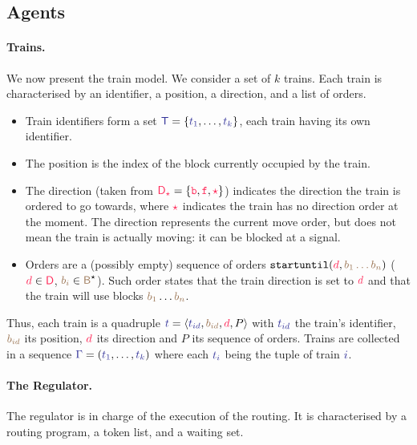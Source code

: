\documentclass[runningheads]{llncs}
\newcommand{\directions}{\dirFmt{\mathsf{D}}}
\newcommand{\forward}{\ensuremath{\mathtt{f}}}
\newcommand{\backward}{\ensuremath{\mathtt{b}}\xspace}
\newcommand{\dirFmt}[1]{{\color{dircolor} #1}}
\newcommand{\dirForward}{\ensuremath{\dirFmt{\forward}}\xspace}
\newcommand{\dirBackward}{\ensuremath{\dirFmt{\backward}}\xspace}
\newcommand{\dirStop}{\ensuremath{\dirFmt{\star}}\xspace}
\newcommand{\posFmt}[1]{{\color{poscolor}{#1}}}
\newcommand{\blocks}{{\posFmt{\mathsf{B}}}}
\newcommand{\bid}[1]{\ensuremath{\posFmt{b_{#1}}}}
\newcommand{\trainFmt}[1]{{\color{traincolor} #1}}
\newcommand{\trainTuple}[4]{\langle \trainFmt{#1}, \posFmt{#2}, \dirFmt{#3}, #4 \rangle}
\newcommand{\trainSeq}{\trainFmt{\Gamma\xspace}}
\newcommand{\trains}{{\trainFmt{\mathsf{T}}}}
\newcommand{\tid}[1]{\ensuremath{\trainFmt{t_{#1}}}}
\newcommand{\su}[2]{{\mbox{$\mathtt{startuntil}(\dirFmt{#1}, \posFmt{#2})$}}\xspace}
\begin{document}
\subsection{Agents}
\paragraph{Trains.}
We now present the train model. We consider a set of $k$ trains. 
Each train is characterised by an identifier, a position, a direction, and a list of orders.
\begin{itemize}
	\item Train identifiers form a set  $\trains = \{\tid{1}, \ldots, \tid{k}\}$, each train having its own identifier.
	\item The position is the index of the block currently occupied by the train.
	\item The direction (taken from $\directions_\dirStop = \{\dirBackward, \dirForward, \dirStop\}$) indicates the direction the train is ordered to go towards, where \dirStop indicates the train has no direction order at the moment. The direction represents the current move order, but does not mean the train is actually moving: it can be blocked at a signal.
	\item Orders are a (possibly empty) sequence of orders $\su{d}{\bid{1}\dots\bid{n}}$ ($\dirFmt{d} \in \directions$, $\bid{i} \in \blocks^\star$). Such order states that the train direction is set to $\dirFmt{d}$ and that the train will use blocks $\bid{1}\dots\bid{n}$.
\end{itemize}

Thus, each train is a quadruple $\trainFmt{t} = \trainTuple{\tid{id}}{\bid{id}}{d}{P}$ with $\tid{id}$ the train's identifier, $\bid{id}$ its position, $\dirFmt{d}$ its direction and $P$ its sequence of orders. Trains are collected in a sequence $\trainSeq = (\trainFmt{t_1}, \ldots, \trainFmt{t_k})$ where each $\trainFmt{t_i}$ being the tuple of train $\trainFmt{i}$. 


\paragraph{The Regulator.}
The regulator is in charge of the execution of the routing.
It is characterised by a routing program, a token list, and a waiting set.
\end{document}
